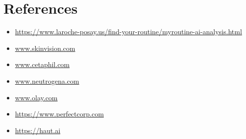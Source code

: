 \documentclass[12pt,a4paper]{article}
\begin{document}
\section{References}
\begin{itemize}
    \item \url{https://www.laroche-posay.us/find-your-routine/myroutine-ai-analysis.html}
    \item \url{www.skinvision.com}
    \item \url{www.cetaphil.com}
    \item \url{www.neutrogena.com}
    \item \url{www.olay.com}
    \item \url{https://www.perfectcorp.com}
    \item \url{https://haut.ai}
\end{itemize}
\end{document}
